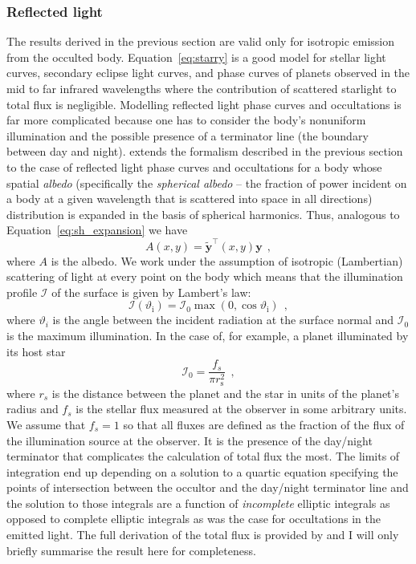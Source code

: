 \documentclass[12pt,dvipsnames]{report}
\newcommand{\hquad}{~~}
\begin{document}
\subsubsection{Reflected light}
The results derived in the previous section are valid only for isotropic emission
from the occulted body. Equation~\ref{eq:starry} is a good model for stellar
light curves, secondary eclipse light curves, and phase curves of planets
observed in the mid to far infrared wavelengths where the contribution of
scattered starlight to total flux is negligible. Modelling reflected light phase
curves and occultations is far more complicated because one has to consider
the body's nonuniform illumination and the possible presence
of a terminator line (the boundary between day and night).
\citet{2021arXiv210306275L} extends the formalism described in the previous
section to the case of reflected light phase curves and occultations for a body
whose spatial \emph{albedo} (specifically the \emph{spherical albedo} -- the
fraction of power incident on a body at a given wavelength that is scattered
into space in all directions) distribution is expanded in the basis of spherical
harmonics. Thus, analogous to Equation~\ref{eq:sh_expansion} we have
\begin{equation}
    A(x, y)=\tilde{\mathbf{y}}^{\intercal}(x, y) \mathbf{y}
    \hquad,
\end{equation}
where $A$ is the albedo. We work under the assumption of isotropic (Lambertian)
scattering of light at every point on the body which means that the illumination
profile $\mathcal{I}$ of the surface is given by Lambert's law:
\begin{equation}
    \mathcal{I}\left(\vartheta_{\mathrm{i}}\right)=\mathcal{I}_{0} \max \left(0, \cos \vartheta_{\mathrm{i}}\right)
    \hquad,
\end{equation}
where $\vartheta_i$ is the angle between the incident radiation at the surface normal
and $\mathcal{I}_0$ is the maximum illumination. In the case of, for example, a planet illuminated
by its host star \citep[Appendix A.2 in][]{2021arXiv210306275L}
\begin{equation}
    \mathcal{I}_{0}=\frac{f_{s}}{\pi r_{\mathrm{s}}^{2}}
    \hquad,
\end{equation}
where $r_s$ is the distance between the planet and the star in units of the planet's radius
and $f_s$ is the stellar flux measured at the observer in some arbitrary units.
We assume that $f_s=1$ so that all fluxes are defined as the fraction of the flux
of the illumination source at the observer.
It is the presence of the day/night terminator that complicates the calculation
of total flux the most. The limits of integration end up depending on a
solution to a quartic equation specifying the points of intersection between
the occultor and the day/night terminator line and the solution to those
integrals are a function of \emph{incomplete} elliptic integrals as opposed to
complete elliptic integrals as was the case for occultations in the emitted light.
The full derivation of the total flux is provided by \citet{2021arXiv210306275L} and
I will only briefly summarise  the result here for completeness.
\end{document}
